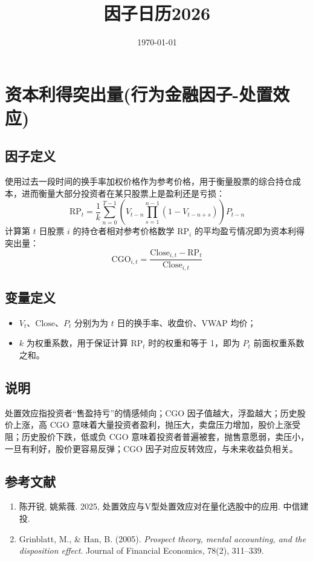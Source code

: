 \documentclass{article}
\title{因子日历2026}
\date{\today}
\begin{document}
\maketitle

\section{资本利得突出量(行为金融因子-处置效应)}

\subsection{因子定义}
使用过去一段时间的换手率加权价格作为参考价格，用于衡量股票的综合持仓成本，进而衡量大部分投资者在某只股票上是盈利还是亏损：
\begin{equation}
    \mathrm{RP}_t = \frac{1}{k} \sum_{n=0}^{T-1} \left( V_{t-n} \prod_{s=1}^{n-1} (1 - V_{t-n+s}) \right) P_{t-n}
\end{equation}
计算第 \( t \) 日股票 \( i \) 的持仓者相对参考价格数学 \( \mathrm{RP}_i \) 的平均盈亏情况即为资本利得突出量：
\begin{equation}
    \mathrm{CGO}_{i,t} = \frac{\mathrm{Close}_{i,t} - \mathrm{RP}_t}{\mathrm{Close}_{i,t}}
\end{equation}

\subsection{变量定义}
\begin{itemize}
    \item \( V_t \)、\( \mathrm{Close} \)、\( P_t \) 分别为为 \( t \) 日的换手率、收盘价、VWAP 均价；
    \item \( k \) 为权重系数，用于保证计算 \( \mathrm{RP}_t \) 时的权重和等于 1，即为 \( P_t \) 前面权重系数之和。
\end{itemize}

\subsection{说明}
处置效应指投资者“售盈持亏”的情感倾向；CGO 因子值越大，浮盈越大；历史股价上涨，高 CGO 意味着大量投资者盈利，抛压大，卖盘压力增加，股价上涨受阻；历史股价下跌，低或负 CGO 意味着投资者普遍被套，抛售意愿弱，卖压小，一旦有利好，股价更容易反弹；CGO 因子对应反转效应，与未来收益负相关。

\subsection{参考文献}
\begin{enumerate}
    \item 陈开锐, 姚紫薇. 2025, 处置效应与V型处置效应对在量化选股中的应用. 中信建投.
    \item Grinblatt, M., \& Han, B. (2005). \textit{Prospect theory, mental accounting, and the disposition effect}. Journal of Financial Economics, 78(2), 311–339.
\end{enumerate}
\end{document}
